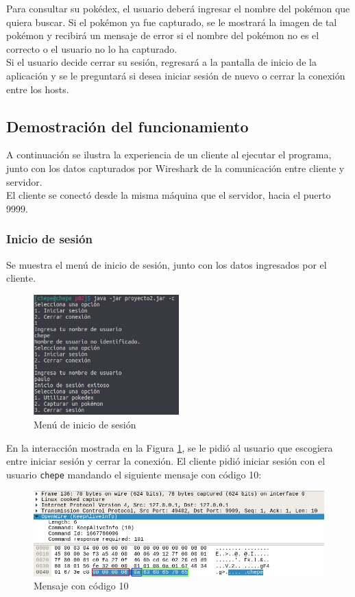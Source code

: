 \documentclass[12pt]{article}
\begin{document}
Para consultar su pokédex, el usuario deberá ingresar el nombre del pokémon que quiera buscar. Si el pokémon ya fue capturado, se le mostrará la imagen de tal pokémon y recibirá un mensaje de error si el nombre del pokémon no es el correcto o el usuario no lo ha capturado. \\

Si el usuario decide cerrar su sesión, regresará a la pantalla de inicio de la aplicación y se le preguntará si desea iniciar sesión de nuevo o cerrar la conexión entre los hosts. \\

\subsection{Demostración del funcionamiento}

A continuación se ilustra la experiencia de un cliente al ejecutar el programa, junto con los datos capturados por Wireshark de la comunicación entre cliente y servidor. \\

El cliente se conectó desde la misma máquina que el servidor, hacia el puerto 9999.

\subsubsection{Inicio de sesión}

Se muestra el menú de inicio de sesión, junto con los datos ingresados por el cliente.

\begin{figure}[H]
  \centering
  \includegraphics[width=0.5\textwidth]{01}
  \caption{Menú de inicio de sesión}
  \label{inicioSesion}
\end{figure}

En la interacción mostrada en la Figura \ref{inicioSesion}, se le pidió al usuario que escogiera entre iniciar sesión y cerrar la conexión. El cliente pidió iniciar sesión con el usuario \texttt{chepe} mandando el siguiente mensaje con código 10:
\begin{figure}[H]
  \centering
  \includegraphics[width=\textwidth]{03}
  \caption{Mensaje con código 10}
\end{figure}
\end{document}

